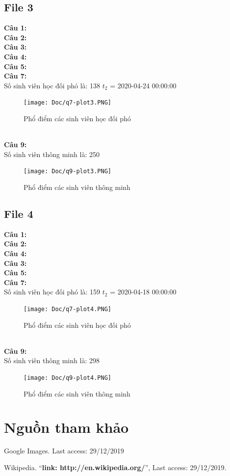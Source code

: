 \documentclass[12pt,a4paper]{article}  %
\begin{document}
\subsection{File 3}
\textbf{Câu 1: }\\
\textbf{Câu 2: }\\
\textbf{Câu 3: }\\
\textbf{Câu 4: }\\
\textbf{Câu 5: }\\
\textbf{Câu 7: }\\
\noindent Số sinh viên học đối phó là: 138
\noindent $t_2$ = 2020-04-24 00:00:00
\begin{figure}[!ht]
    \centering
    \texttt{[image: Doc/q7-plot3.PNG]}
    \caption{Phổ điểm các sinh viên học đối phó}
    \label{fig:my_label}
\end{figure}
\\
\textbf{Câu 9: }\\
\noindent Số sinh viên thông minh là: 250
\begin{figure}[!ht]
    \centering
    \texttt{[image: Doc/q9-plot3.PNG]}
    \caption{Phổ điểm các sinh viên thông minh}
    \label{fig:my_label}
\end{figure}
\newpage


\subsection{File 4}
\textbf{Câu 1: }\\
\textbf{Câu 2: }\\
\textbf{Câu 4: }\\
\textbf{Câu 3: }\\
\textbf{Câu 5: }\\
\textbf{Câu 7: }\\
\noindent Số sinh viên học đối phó là: 159
\noindent $t_2$ = 2020-04-18 00:00:00
\begin{figure}[!ht]
    \centering
    \texttt{[image: Doc/q7-plot4.PNG]}
    \caption{Phổ điểm các sinh viên học đối phó}
    \label{fig:my_label}
\end{figure}
\\
\textbf{Câu 9: }\\
\noindent Số sinh viên thông minh là: 298
\begin{figure}[!ht]
    \centering
    \texttt{[image: Doc/q9-plot4.PNG]}
    \caption{Phổ điểm các sinh viên thông minh}
    \label{fig:my_label}
\end{figure}
\newpage
\section{Nguồn tham khảo}
\begin{thebibliography}{80}


	 Google Images. Last access: 29/12/2019


	 Wikipedia.
	``\textbf{link: http://en.wikipedia.org/}'',
	Last access: 29/12/2019.
	
	
	
\end{thebibliography}	
\end{document}
